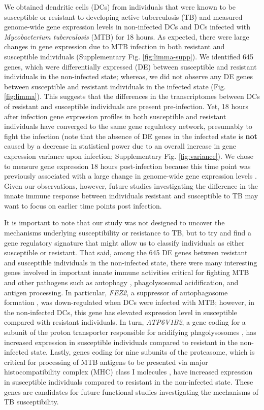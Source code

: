 \documentclass[fleqn,10pt]{wlscirep}
\begin{document}
We obtained dendritic cells (DCs) from individuals that were known to
be susceptible or resistant to developing active tuberculosis (TB) and
measured genome-wide gene expression levels in non-infected DCs and
DCs infected with \emph{Mycobacterium tuberculosis} (MTB) for 18
hours. As expected, there were large changes in gene expression due to
MTB infection in both resistant and susceptible individuals
(Supplementary Fig. \ref{fig:limma-supp}). We identified 645 genes,
which were differentially expressed (DE) between susceptible and
resistant individuals in the non-infected state; whereas, we did not
observe any DE genes between susceptible and resistant individuals in
the infected state (Fig. \ref{fig:limma}). This suggests that the
differences in the transcriptomes between DCs of resistant and
susceptible individuals are present pre-infection. Yet, 18 hours after
infection gene expression profiles in both susceptible and resistant
individuals have converged to the same gene regulatory network,
presumably to fight the infection (note that the absence of DE genes
in the infected state is \textbf{not} caused by a decrease in
statistical power due to an overall increase in gene expression
variance upon infection; Supplementary Fig. \ref{fig:variance}). We
chose to measure gene expression 18 hours post-infection because this
time point was previously associated with a large change in
genome-wide gene expression levels \cite{Tailleux2008}. Given our
observations, however, future studies investigating the difference in
the innate immune response between individuals resistant and
susceptible to TB may want to focus on earlier time points post
infection.

It is important to note that our study was not designed to uncover the
mechanisms underlying susceptibility or resistance to TB, but to try
and find a gene regulatory signature that might allow us to classify
individuals as either susceptible or resistant. That said, among the
645 DE genes between resistant and susceptible individuals in the
non-infected state, there were many interesting genes involved in
important innate immune activities critical for fighting MTB and other
pathogens such as autophagy \cite{Deretic2014, Castrejon-Jimenez2015},
phagolysosomal acidification, and antigen processing. In particular,
\emph{FEZ2}, a suppressor of autophagosome formation \cite{Spang2014},
was down-regulated when DCs were infected with MTB; however, in the
non-infected DCs, this gene has elevated expression level in
susceptible compared with resistant individuals. In turn,
\emph{ATP6V1B2}, a gene coding for a subunit of the proton transporter
responsible for acidifying phagolysosomes \cite{Sturgill-Koszycki1994,
Hornef2002, Hestvik2005}, has increased expression in susceptible
individuals compared to resistant in the non-infected state. Lastly,
genes coding for nine subunits of the proteasome, which is critical
for processing of MTB antigens to be presented via major
histocompatibility complex (MHC) class I molecules \cite{Flynn1992,
Grotzke2009, Grotzke2010, LindestamArlehamn2014}, have increased
expression in susceptible individuals compared to resistant in the
non-infected state. These genes are candidates for future functional
studies investigating the mechanisms of TB susceptibility.
\end{document}

